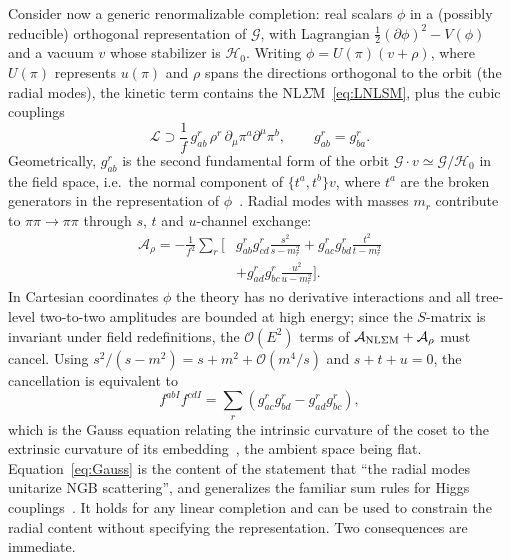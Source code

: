 \documentclass[aps,prd,twocolumn,superscriptaddress,nofootinbib,floatfix]{revtex4-2}
\theoremstyle{remark}
\newcommand{\G}{\mathcal{G}}
\newcommand{\Hg}{\mathcal{H}_0}    %
\newcommand{\ie}{i.e.}
\begin{document}
Consider now a generic renormalizable completion: real scalars $\phi$ in a (possibly reducible) orthogonal representation of $\G$, with Lagrangian $\tfrac12(\partial\phi)^2-V(\phi)$ and a vacuum $v$ whose stabilizer is $\Hg$. Writing $\phi=U(\pi)(v+\rho)$, where $U(\pi)$ represents $u(\pi)$ and $\rho$ spans the directions orthogonal to the orbit (the radial modes), the kinetic term contains the NL$\Sigma$M~\eqref{eq:LNLSM}, plus the cubic couplings
\begin{equation}
\mathcal{L}\supset \frac{1}{f}\,g^r_{ab}\,\rho^r\,\partial_\mu\pi^a\partial^\mu\pi^b ,\qquad g^r_{ab}=g^r_{ba}.
\label{eq:cubicgeneric}
\end{equation}
Geometrically, $g^r_{ab}$ is the second fundamental form of the orbit $\G\cdot v\simeq\G/\Hg$ in the field space, \ie\ the normal component of $\{t^a,t^b\}v$, where $t^a$ are the broken generators in the representation of $\phi$~\cite{Alonso:2016oah,Cohen:2021ucp}. Radial modes with masses $m_r$ contribute to $\pi\pi\to\pi\pi$ through $s$, $t$ and $u$-channel exchange:
\begin{equation}
\begin{split}
\mathcal{A}_\rho=-\frac{1}{f^2}\sum_r\bigg[&g^r_{ab}g^r_{cd}\frac{s^2}{s-m_r^2}+g^r_{ac}g^r_{bd}\frac{t^2}{t-m_r^2}\\
&+g^r_{ad}g^r_{bc}\frac{u^2}{u-m_r^2}\bigg].
\end{split}
\label{eq:Arho}
\end{equation}
In Cartesian coordinates $\phi$ the theory has no derivative interactions and all tree-level two-to-two amplitudes are bounded at high energy; since the $S$-matrix is invariant under field redefinitions, the $\mathcal{O}(E^2)$ terms of $\mathcal{A}_{\rm NL\Sigma M}+\mathcal{A}_\rho$ must cancel. Using $s^2/(s-m^2)=s+m^2+\mathcal{O}(m^4/s)$ and $s+t+u=0$, the cancellation is equivalent to
\begin{equation}
\boxed{\;f^{abI}f^{cdI}=\sum_r\left(g^r_{ac}g^r_{bd}-g^r_{ad}g^r_{bc}\right),\;}
\label{eq:Gauss}
\end{equation}
which is the Gauss equation relating the intrinsic curvature of the coset to the extrinsic curvature of its embedding~\cite{KobayashiNomizu}, the ambient space being flat. Equation~\eqref{eq:Gauss} is the content of the statement that ``the radial modes unitarize NGB scattering'', and generalizes the familiar sum rules for Higgs couplings~\cite{Gunion:1990kf,Falkowski:2012vh}. It holds for any linear completion and can be used to constrain the radial content without specifying the representation. Two consequences are immediate.
\end{document}
